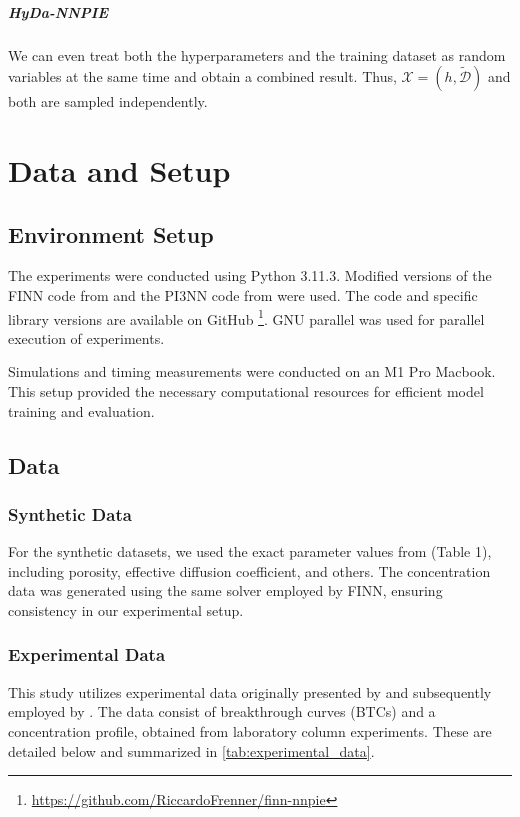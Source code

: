 \paragraph{HyDa-NNPIE}

We can even treat both the hyperparameters and the training dataset as random variables at the same time and obtain a combined result. Thus, $\mathcal{X} = (h, \tilde{\mathcal{D}})$ and both are sampled independently.



\chapter{Data and Setup}
\label{sec:data_and_setup}
\section{Environment Setup}
The experiments were conducted using Python 3.11.3. Modified versions of the FINN code from \textcite{finn} and the PI3NN code from \textcite{pi3nn} were used. The code and specific library versions are available on GitHub \footnote{\url{https://github.com/RiccardoFrenner/finn-nnpie}}. GNU parallel \cite{tange_2023_10199085} was used for parallel execution of experiments.

Simulations and timing measurements were conducted on an M1 Pro Macbook. This setup provided the necessary computational resources for efficient model training and evaluation.


\section{Data}
\subsection{Synthetic Data}
\label{sec:synthetic_data}
For the synthetic datasets, we used the exact parameter values from \textcite{finn} (Table 1), including porosity, effective diffusion coefficient, and others. The concentration data was generated using the same solver employed by FINN, ensuring consistency in our experimental setup.


\subsection{Experimental Data}
\label{sec:experimental_data}

This study utilizes experimental data originally presented by \textcite{nowak2016entropy} and subsequently employed by \textcite{finn}. The data consist of breakthrough curves (BTCs) and a concentration profile, obtained from laboratory column experiments. These are detailed below and summarized in \cref{tab:experimental_data}.

